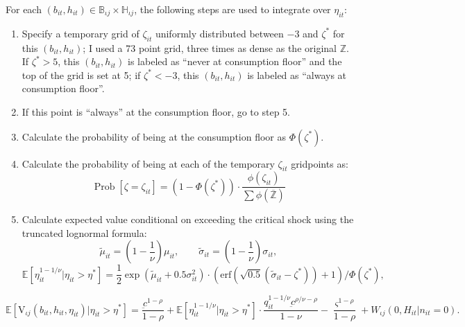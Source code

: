 \documentclass[12pt,pdftex,letterpaper]{article}
\newcommand{\Prob}{\operatorname{Prob}}
\newcommand{\erf}{\text{erf}}
\newcommand{\E}{\mathbb{E}}
\newcommand{\Type}{\iota}
\newcommand{\Health}{h}
\newcommand{\PostHealth}{H}
\newcommand{\Value}{\text{V}}
\newcommand{\PostValue}{W}
\newcommand{\Con}{c}
\newcommand{\Invst}{n}
\newcommand{\Bank}{b}
\newcommand{\Copay}{q}
\newcommand{\ConFloor}{\underbar{\Con}}
\newcommand{\LifeUtility}{\varsigma}
\newcommand{\CRRAcon}{\rho}
\newcommand{\CRRAcare}{\nu}
\newcommand{\Age}{j}
\newcommand{\MedShk}{\eta}
\begin{document}
For each $(\Bank_{it},\Health_{it}) \in \mathbb{B}_{\Type \Age} \times \mathbb{H}_{\Type \Age}$, the following steps are used to integrate over $\MedShk_{it}$:
\begin{enumerate}
\item Specify a temporary grid of $\zeta_{it}$ uniformly distributed between $-3$ and $\zeta^*$ for this $(\Bank_{it},\Health_{it})$; I used a 73 point grid, three times as dense as the original $\mathbb{Z}$.  If $\zeta^* > 5$, this $(\Bank_{it},\Health_{it})$ is labeled as ``never at consumption floor'' and the top of the grid is set at 5; if $\zeta^* < -3$, this $(\Bank_{it},\Health_{it})$ is labeled as ``always at consumption floor''.

\item If this point is ``always'' at the consumption floor, go to step 5.

\item Calculate the probability of being at the consumption floor as $\Phi(\zeta^*)$.

\item Calculate the probability of being at each of the temporary $\zeta_{it}$ gridpoints as:
\begin{equation}
\Prob[\zeta = \zeta_{it}] = (1 - \Phi(\zeta^*)) \cdot \frac{\phi(\zeta_{it})} {\sum \phi(\overline{\mathbb{Z}})}
\end{equation}

\item Calculate expected value conditional on exceeding the critical shock using the truncated lognormal formula:
\begin{equation*}
\tilde{\mu}_{it}  = \left(1 - \frac{1}{\CRRAcare}\right) \mu_{it}, \qquad \tilde{\sigma}_{it} = \left(1 - \frac{1}{\CRRAcare}\right) \sigma_{it},
\end{equation*}
\begin{equation}
\E [\MedShk_{it}^{1-1/\CRRAcare} | \MedShk_{it} > \MedShk^*] = \frac{1}{2} \exp(\tilde{\mu}_{it}+0.5 \sigma_{it}^2) \cdot \left( \erf \left( \sqrt{0.5}(\tilde{\sigma}_{it}-\zeta^*) \right) + 1 \right) / \Phi(\zeta^*),
\end{equation}
\end{enumerate}
\begin{equation*}
\E [\Value_{\Type \Age}(\Bank_{it},\Health_{it},\MedShk_{it}) | \MedShk_{it} > \MedShk^* ] = \frac{\ConFloor^{1-\CRRAcon}}{1-\CRRAcon} + \E [\MedShk_{it}^{1-1/\CRRAcare} | \MedShk_{it} > \MedShk^*] \cdot \frac{\Copay_{it}^{1- 1/\CRRAcare} \ConFloor^{\CRRAcon/\CRRAcare - \CRRAcon}}{1 - \CRRAcare} - \frac{\LifeUtility^{1-\CRRAcon}}{1-\CRRAcon} + \PostValue_{\Type \Age}(0,\PostHealth_{it} | \Invst_{it}=0).
\end{equation*}
\end{document}
